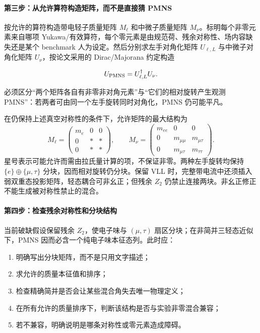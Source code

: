 \documentclass[
  chinese,
  UTF8]{ctexart}
\providecommand{\tightlist}{%
  \setlength{\itemsep}{0pt}\setlength{\parskip}{0pt}}
\begin{document}
\paragraph{第三步：从允许算符构造矩阵，而不是直接猜
PMNS}\label{ux7b2cux4e09ux6b65ux4eceux5141ux8bb8ux7b97ux7b26ux6784ux9020ux77e9ux9635ux800cux4e0dux662fux76f4ux63a5ux731c-pmns}

按允许的算符构造带电轻子质量矩阵 \(M_\ell\) 和中微子质量矩阵
\(M_\nu\)。标明每个非零元素来自哪项
Yukawa/有效算符，每个零元素是由规范荷、残余对称性、场内容缺失还是某个
benchmark 人为设定。然后分别求左手对角化矩阵 \(U_{\ell,L}\)
与中微子对角化矩阵 \(U_\nu\)，按论文采用的 Dirac/Majorana 约定构造

\[U_{\rm PMNS}=U_{\ell,L}^\dagger U_\nu.\]

必须区分``两个矩阵各自有非零非对角元素''与``它们的相对旋转产生观测
PMNS''：若两者可由同一个左手旋转同时对角化，PMNS 仍可能平凡。

在仍保持上述真空对称性的条件下，允许矩阵的最大结构为 \[
M_\ell=\begin{pmatrix}m_e&0&0\\0&*&*\\0&*&*\end{pmatrix},\qquad
M_\nu=\begin{pmatrix}m_{ee}&0&0\\0&m_{\mu\mu}&m_{\mu\tau}\\0&m_{\mu\tau}&m_{\tau\tau}\end{pmatrix}.
\] 星号表示可能允许而需由拉氏量计算的项，不保证非零。两种左手旋转均保持
\(\{e\}\oplus\{\mu,\tau\}\) 分块，因而相对旋转仍分块。保留 VLL
时，完整带电流中还须插入弱双重态投影矩阵，轻态耦合可非幺正；但残余
\(Z_2\) 仍禁止连接两块。非幺正修正不能生成被对称性禁止的混合。

\paragraph{第四步：检查残余对称性和分块结构}\label{ux7b2cux56dbux6b65ux68c0ux67e5ux6b8bux4f59ux5bf9ux79f0ux6027ux548cux5206ux5757ux7ed3ux6784}

当前破缺假设保留残余 \(Z_2\)，使电子味与 \((\mu,\tau)\)
扇区分块；在非简并三轻态近似下，PMNS
因而必含一个纯电子味本征态列。此时应：

\begin{enumerate}
\def\labelenumi{\arabic{enumi}.}
\tightlist
\item
  明确写出分块矩阵，而不是只用文字描述；
\item
  求允许的质量本征值和排序；
\item
  检查精确简并是否会让某些混合角失去唯一物理定义；
\item
  在所有允许的质量排序下，判断该结构是否与实验非零混合兼容；
\item
  若不兼容，明确说明是哪条对称性或零元素造成障碍。
\end{enumerate}
\end{document}
